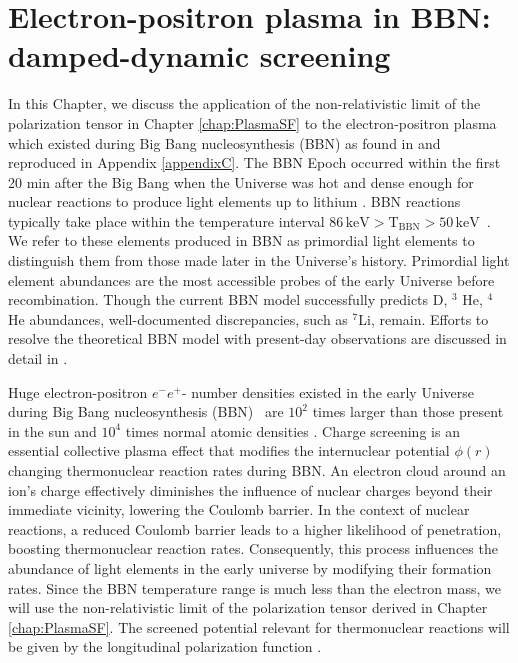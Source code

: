 \section{Electron-positron plasma in BBN: damped-dynamic screening}\label{chap:bbn}

In this Chapter, we discuss the application of the non-relativistic limit of the polarization tensor in Chapter \ref{chap:PlasmaSF} to the electron-positron plasma which existed during Big Bang nucleosynthesis (BBN) as found in \cite{Grayson:2023flr} and reproduced in Appendix \ref{appendixC}. The BBN Epoch occurred within the first 20 min after the Big Bang when the Universe was hot and dense enough for nuclear reactions to produce light elements up to lithium \cite{Pitrou:2018cgg}. BBN reactions typically take place within the temperature interval $86\, \mathrm{keV}>\mathrm{T_{BBN}}>50\, \mathrm{keV}$~\cite{Pitrou:2018cgg}. We refer to these elements produced in BBN as primordial light elements to distinguish them from those made later in the Universe's history. Primordial light element abundances are the most accessible probes of the early Universe before recombination. Though the current BBN model successfully predicts D, $^3$ He, $^4$ He abundances, well-documented discrepancies, such as $^7$Li, remain. Efforts to resolve the theoretical BBN model with present-day observations are discussed in detail in \cite{Pitrou:2021vqr,Bertulani:2022qly}.

Huge electron-positron $e^-e^+$- number densities existed in the early Universe during Big Bang nucleosynthesis (BBN)~\cite{ Wang:2010px, Hwang:2021kno, Rafelski:2023emw} are $10^2$ times larger than those present in the sun \cite{bahcall2001solar} and $10^4$ times normal atomic densities \cite{Grayson:2023flr}. Charge screening is an essential collective plasma effect that modifies the internuclear potential $\phi(r)$ changing thermonuclear reaction rates during BBN. An electron cloud around an ion's charge effectively diminishes the influence of nuclear charges beyond their immediate vicinity, lowering the Coulomb barrier. In the context of nuclear reactions, a reduced Coulomb barrier leads to a higher likelihood of penetration, boosting thermonuclear reaction rates. Consequently, this process influences the abundance of light elements in the early universe by modifying their formation rates. Since the BBN temperature range is much less than the electron mass, we will use the non-relativistic limit of the polarization tensor derived in Chapter \ref{chap:PlasmaSF}. The screened potential relevant for thermonuclear reactions will be given by the longitudinal polarization function .

